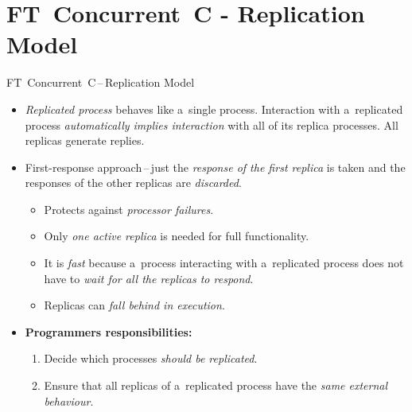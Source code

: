 \documentclass[
    10pt, hyperref={unicode, colorlinks, hypertexnames=false,
    linkcolor=white}, aspectratio=169
]{beamer}
\begin{document}
\section{FT~Concurrent~C - Replication Model}
\begin{frame}{FT~Concurrent~C\,--\,Replication Model}
    \begin{itemize}\setlength\itemsep{1em}
        \item
            \emph{Replicated process} behaves like a~\alert{single process}.
            Interaction with a~replicated process \emph{automatically implies
            interaction} with all of its replica processes. All replicas
            generate replies.

        \item
            \alert{First-response approach}\,--\,just the \emph{response of
            the first replica} is taken and the responses of the other
            replicas are \emph{discarded}.

            \begin{itemize}\setlength\itemsep{.3em}
                \item
                    Protects against \emph{processor failures}.

                \item
                    Only \emph{one active replica} is needed for full
                    functionality.

                \item
                    It is \emph{fast} because a~process interacting with
                    a~replicated process does not have to \emph{wait for all
                    the replicas to respond}.

                \item
                    Replicas can \emph{fall behind in execution}.%
            \end{itemize}

        \item
            \textbf{Programmers responsibilities:}

            \begin{enumerate}\setlength\itemsep{.5em}
                \item
                    Decide which processes \emph{should be replicated}.

                \item
                    Ensure that all replicas of a~replicated process have
                    the \emph{same external behaviour}.
            \end{enumerate}
    \end{itemize}
\end{frame}
\end{document}
